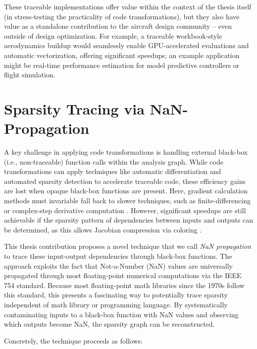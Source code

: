 \documentclass[12pt,vi,oneside,table]{report}
\begin{document}
    These traceable implementations offer value within the context of the thesis itself (in stress-testing the practicality of code transformations), but they also have value as a standalone contribution to the aircraft design community -- even outside of design optimization. For example, a traceable workbook-style aerodynamics buildup would seamlessly enable GPU-accelerated evaluations and automatic vectorization, offering significant speedups; an example application might be real-time performance estimation for model predictive controllers or flight simulation.


    \section{Sparsity Tracing via NaN-Propagation}
    \label{sec:nan_propagation}

    A key challenge in applying code transformations is handling external black-box (i.e., non-traceable) function calls within the analysis graph. While code transformations can apply techniques like automatic differentiation and automated sparsity detection to accelerate traceable code, these efficiency gains are lost when opaque black-box functions are present. Here, gradient calculation methods must invariable fall back to slower techniques, such as finite-differencing or complex-step derivative computation \cite{martins_complexstep_2003}. However, significant speedups are still achievable if the sparsity pattern of dependencies between inputs and outputs can be determined, as this allows Jacobian compression via coloring \cite{gebremedhin_efficient_2009, gebremedhin_what_2005}.

    This thesis contribution proposes a novel technique that we call \textit{NaN propagation} to trace these input-output dependencies through black-box functions. The approach exploits the fact that Not-a-Number (NaN) values are universally propagated through most floating-point numerical computations via the IEEE 754 standard. Because most floating-point math libraries since the 1970s follow this standard, this presents a fascinating way to potentially trace sparsity independent of math library or programming language. By systematically contaminating inputs to a black-box function with NaN values and observing which outputs become NaN, the sparsity graph can be reconstructed.

    Concretely, the technique proceeds as follows:
\end{document}
